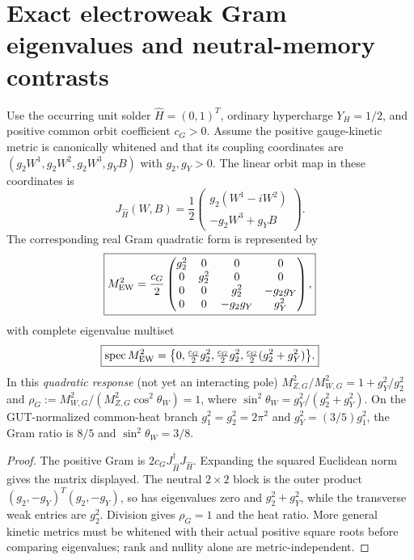 \documentclass[12pt,a4paper]{article}
\begin{document}
\section{Exact electroweak Gram eigenvalues and neutral-memory contrasts}
\label{p5c:sec:v348-gram-memory}
\begin{theorem}
\label{p5c:thm:v348-ew-gram-eigenvalues}
Use the occurring unit solder $\widehat H=(0,1)^T$, ordinary
hypercharge $Y_H=1/2$, and positive common orbit coefficient
$c_G>0$.  Assume the positive gauge-kinetic metric is canonically
whitened and that its coupling coordinates are
$(g_2W^1,g_2W^2,g_2W^3,g_YB)$ with $g_2,g_Y>0$.
The linear orbit map in these coordinates is
\[
 J_{\widehat H}(W,B)=\frac12
 \begin{pmatrix}g_2(W^1-iW^2)\\-g_2W^3+g_YB\end{pmatrix}.
\]
The corresponding real Gram quadratic form is represented by
\[
 \boxed{M^2_{\rm EW}=\frac{c_G}{2}
 \begin{pmatrix}
 g_2^2&0&0&0\\
 0&g_2^2&0&0\\
 0&0&g_2^2&-g_2g_Y\\
 0&0&-g_2g_Y&g_Y^2
 \end{pmatrix},}
\]
with complete eigenvalue multiset
\[
 \boxed{\operatorname{spec}M^2_{\rm EW}=
 \bigl\{0,\tfrac{c_G}2g_2^2,\tfrac{c_G}2g_2^2,
              \tfrac{c_G}2(g_2^2+g_Y^2)\bigr\}.}
\]
In this \emph{quadratic response} (not yet an interacting pole)
$M_{Z,G}^2/M_{W,G}^2=1+g_Y^2/g_2^2$ and
$\rho_G:=M_{W,G}^2/(M_{Z,G}^2\cos^2\theta_W)=1$, where
$\sin^2\theta_W=g_Y^2/(g_2^2+g_Y^2)$.  On the
GUT-normalized common-heat branch $g_1^2=g_2^2=2\pi^2$ and
$g_Y^2=(3/5)g_1^2$, the Gram ratio is $8/5$ and
$\sin^2\theta_W=3/8$.
\end{theorem}
\begin{proof}
The positive Gram is $2c_G J_{\widehat H}^\dagger
J_{\widehat H}$.  Expanding the squared Euclidean norm gives the
matrix displayed.  The neutral $2\times2$ block is the outer
product $(g_2,-g_Y)^T(g_2,-g_Y)$, so has eigenvalues zero and
$g_2^2+g_Y^2$, while the transverse weak entries are $g_2^2$.
Division gives $\rho_G=1$ and the heat ratio.  More general
kinetic metrics must be whitened with their actual positive square
roots before comparing eigenvalues; rank and nullity alone are
metric-independent.
\end{proof}
\end{document}
